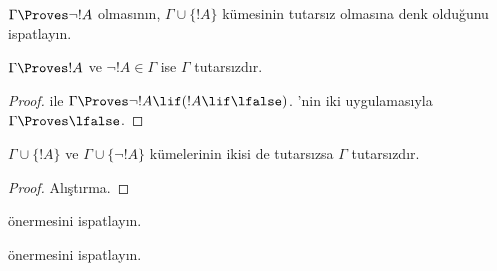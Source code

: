 \begin{prob}
$\Gamma \Proves \lnot !A$ olmasının, $\Gamma \cup \{!A\}$ kümesinin
tutarsız olmasına denk olduğunu ispatlayın.
\end{prob}

\begin{prop}
  $\Gamma \Proves !A$ ve $\lnot !A \in \Gamma$ ise $\Gamma$ tutarsızdır.
\end{prop}

\begin{proof}
   ile $\Gamma \Proves \lnot !A \lif
  (!A \lif \lfalse)$. 'nin iki uygulamasıyla
  $\Gamma \Proves \lfalse$.
\end{proof}

\begin{prop}
  $\Gamma \cup \{!A\}$ ve $\Gamma \cup \{\lnot !A\}$ kümelerinin ikisi de
  tutarsızsa $\Gamma$ tutarsızdır.
\end{prop}

\begin{proof}
Alıştırma.
\end{proof}

\begin{prob}
   önermesini ispatlayın.
\end{prob}
\tagendprob

\begin{prob}
   önermesini ispatlayın.
\end{prob}
\tagendprob

